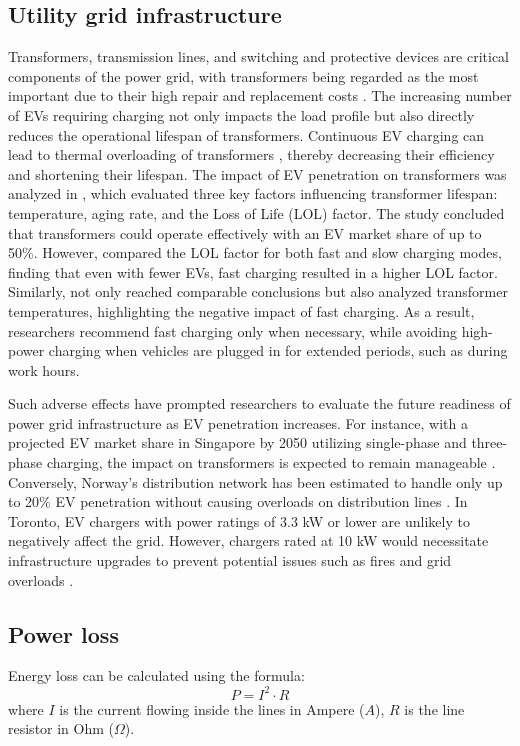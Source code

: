 \documentclass{thesis}
\begin{document}
\subsection{Utility grid infrastructure}
Transformers, transmission lines, and switching and protective devices are critical components of the power grid, with transformers being regarded as the most important due to their high repair and replacement costs \cite{62_greenin}. The increasing number of EVs requiring charging not only impacts the load profile but also directly reduces the operational lifespan of transformers. Continuous EV charging can lead to thermal overloading of transformers \cite{63_greenin, 64_greenin, 65_greenin}, thereby decreasing their efficiency and shortening their lifespan. The impact of EV penetration on transformers was analyzed in \cite{64_greenin}, which evaluated three key factors influencing transformer lifespan: temperature, aging rate, and the Loss of Life (LOL) factor. The study concluded that transformers could operate effectively with an EV market share of up to 50\%. However, \cite{65_greenin} compared the LOL factor for both fast and slow charging modes, finding that even with fewer EVs, fast charging resulted in a higher LOL factor. Similarly, \cite{63_greenin} not only reached comparable conclusions but also analyzed transformer temperatures, highlighting the negative impact of fast charging. As a result, researchers recommend fast charging only when necessary, while avoiding high-power charging when vehicles are plugged in for extended periods, such as during work hours.

Such adverse effects have prompted researchers to evaluate the future readiness of power grid infrastructure as EV penetration increases. For instance, with a projected EV market share in Singapore by 2050 utilizing single-phase and three-phase charging, the impact on transformers is expected to remain manageable \cite{66_greenin}. Conversely, Norway's distribution network has been estimated to handle only up to 20\% EV penetration without causing overloads on distribution lines \cite{67_greenin}. In Toronto, EV chargers with power ratings of 3.3 kW or lower are unlikely to negatively affect the grid. However, chargers rated at 10 kW would necessitate infrastructure upgrades to prevent potential issues such as fires and grid overloads \cite{68_greenin}. 

\subsection{Power loss}
Energy loss can be calculated using the formula:
\begin{equation}
    P = I^2 \cdot R
\end{equation}
where $I$ is the current flowing inside the lines in Ampere ($A$), $R$ is the line resistor in Ohm ($\Omega$).
\end{document}
